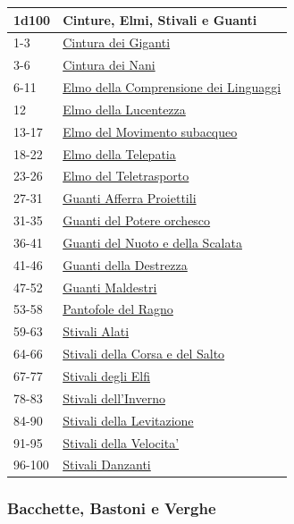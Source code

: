 \begin{multicols}{2}
{{\small\begin{tabularx}{0.45\textwidth}{lX}
	\toprule
\textbf{1d100} & \textbf{Cinture, Elmi, Stivali e Guanti}\\
\toprule
1-3 & \hyperlink{Cintura dei Giganti}{Cintura dei Giganti}\\
3-6 & \hyperlink{Cintura dei Nani}{Cintura dei Nani}\\
6-11 & \hyperlink{Elmo della Comprensione dei Linguaggi}{Elmo della Comprensione dei Linguaggi}\\
12 & \hyperlink{Elmo della Lucentezza}{Elmo della Lucentezza}\\
13-17 & \hyperlink{Elmo del Movimento subacqueo}{Elmo del Movimento subacqueo}\\
18-22 & \hyperlink{Elmo della Telepatia}{Elmo della Telepatia}\\
23-26 & \hyperlink{Elmo del Teletrasporto}{Elmo del Teletrasporto}\\
27-31 & \hyperlink{Guanti Afferra Proiettili}{Guanti Afferra Proiettili}\\
31-35 & \hyperlink{Guanti del Potere orchesco}{Guanti del Potere orchesco}\\
36-41 & \hyperlink{Guanti del Nuoto edella Scalata}{Guanti del Nuoto e della Scalata}\\
41-46 & \hyperlink{Guanti della Destrezza}{Guanti della Destrezza}\\
47-52 & \hyperlink{Guanti Maldestri}{Guanti Maldestri}\\
53-58 & \hyperlink{Pantofole del Ragno}{Pantofole del Ragno}\\
59-63 & \hyperlink{Stivali Alati}{Stivali Alati}\\
64-66 & \hyperlink{Stivali della Corsa e del Salto}{Stivali della Corsa e del Salto}\\
67-77 & \hyperlink{Stivali degli Elfi}{Stivali degli Elfi}\\
78-83 & \hyperlink{Stivali dell'Inverno}{Stivali dell'Inverno}\\
84-90 & \hyperlink{Stivali della Levitazione}{Stivali della Levitazione}\\
91-95 & \hyperlink{Stivalid ella Velocita'}{Stivali della Velocita'}\\
96-100 & \hyperlink{StivaliDanzanti}{Stivali Danzanti}\\
\end{tabularx}}

\subsubsection{Bacchette, Bastoni e Verghe}\hypertarget{bastonibacchette}{}\label{bastonibacchette}

}
\end{multicols}

